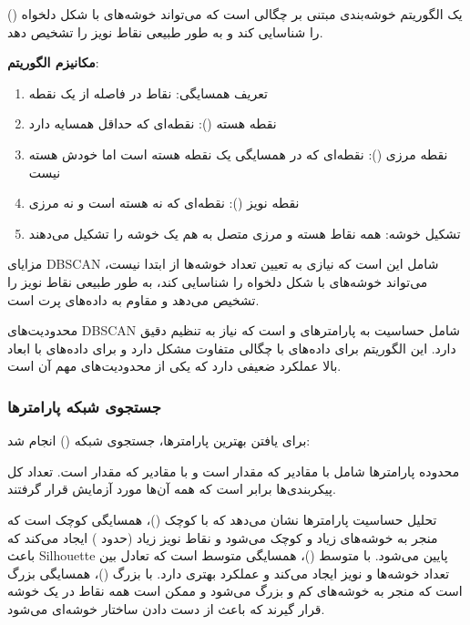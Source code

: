 \documentclass{article}
\begin{document}
 () یک الگوریتم خوشه‌بندی مبتنی بر چگالی است که می‌تواند خوشه‌های با شکل دلخواه را شناسایی کند و به طور طبیعی نقاط نویز را تشخیص دهد.

\textbf{مکانیزم الگوریتم}:
\begin{enumerate}
    \item تعریف همسایگی: نقاط در فاصله  از یک نقطه
    \item نقطه هسته (): نقطه‌ای که حداقل  همسایه دارد
    \item نقطه مرزی (): نقطه‌ای که در همسایگی یک نقطه هسته است اما خودش هسته نیست
    \item نقطه نویز (): نقطه‌ای که نه هسته است و نه مرزی
    \item تشکیل خوشه: همه نقاط هسته و مرزی متصل به هم یک خوشه را تشکیل می‌دهند
\end{enumerate}

مزایای DBSCAN شامل این است که نیازی به تعیین تعداد خوشه‌ها از ابتدا نیست، می‌تواند خوشه‌های با شکل دلخواه را شناسایی کند، به طور طبیعی نقاط نویز را تشخیص می‌دهد و مقاوم به داده‌های پرت است.

محدودیت‌های DBSCAN شامل حساسیت به پارامترهای  و  است که نیاز به تنظیم دقیق دارد. این الگوریتم برای داده‌های با چگالی متفاوت مشکل دارد و برای داده‌های با ابعاد بالا عملکرد ضعیفی دارد که یکی از محدودیت‌های مهم آن است.

\subsubsection{جستجوی شبکه پارامترها}

برای یافتن بهترین پارامترها، جستجوی شبکه () انجام شد:

محدوده پارامترها شامل  با مقادیر \lr{[0.2, 0.4, 0.6, 0.8, 1.0]} که  مقدار است و  با مقادیر \lr{[3, 5, 10]} که  مقدار است. تعداد کل پیکربندی‌ها برابر  است که همه آن‌ها مورد آزمایش قرار گرفتند.

تحلیل حساسیت پارامترها نشان می‌دهد که با  کوچک ()، همسایگی کوچک است که منجر به خوشه‌های زیاد و کوچک می‌شود و نقاط نویز زیاد (حدود ) ایجاد می‌کند که باعث Silhouette پایین می‌شود. با  متوسط ()، همسایگی متوسط است که تعادل بین تعداد خوشه‌ها و نویز ایجاد می‌کند و عملکرد بهتری دارد. با  بزرگ ()، همسایگی بزرگ است که منجر به خوشه‌های کم و بزرگ می‌شود و ممکن است همه نقاط در یک خوشه قرار گیرند که باعث از دست دادن ساختار خوشه‌ای می‌شود.
\end{document}
